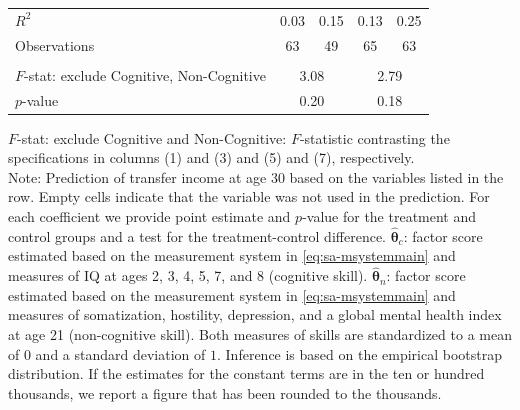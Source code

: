 \documentclass[static]{JJH-Beamer}
\begin{document}
\begin{frame}
\begin{table}[H]
\begin{center}
{\begin{tabular}{lcccccccc}
$R^2$  &          \multicolumn{2}{c}{0.03} &            \multicolumn{2}{c}{0.15} &                  \multicolumn{2}{c}{0.13} &               \multicolumn{2}{c}{0.25}  \\
Observations &        \multicolumn{2}{c}{63} &               \multicolumn{2}{c}{49}  &             \multicolumn{2}{c}{65}  &         \multicolumn{2}{c}{63}  \\   \\
\midrule
$F$-stat: exclude Cognitive, Non-Cognitive &                    \multicolumn{4}{c}{3.08} &                   \multicolumn{4}{c}{2.79}  \\
$p$-value &              \multicolumn{4}{c}{0.20} &                    \multicolumn{4}{c}{0.18}  \\
\bottomrule
\end{tabular}
}
\end{center}
\tiny \flushleft
$F$-stat: exclude Cognitive and Non-Cognitive: $F$-statistic contrasting the specifications in columns (1) and (3) and (5) and (7), respectively.\\
Note: Prediction of transfer income at age 30 based on the variables listed in the row. Empty cells indicate that the variable was not used in the prediction. For each coefficient we provide point estimate and $p$-value for the treatment and control groups and a test for the treatment-control difference. $\hat{\bm{\theta}}_{c}$: factor score estimated based on the measurement system in \eqref{eq:sa-msystemmain} and measures of IQ at ages 2, 3, 4, 5, 7, and 8 (cognitive skill). $\hat{\bm{\theta}}_{n}$: factor score estimated based on the measurement system in \eqref{eq:sa-msystemmain} and measures of somatization, hostility, depression, and a global mental health index at age 21 (non-cognitive skill). Both measures of skills are standardized to a mean of $0$ and a standard deviation of $1$. Inference is based on the empirical bootstrap distribution. If the estimates for the constant terms are in the ten or hundred thousands, we report a figure that has been rounded to the thousands.\\
\end{table}

\end{frame}
\end{document}
